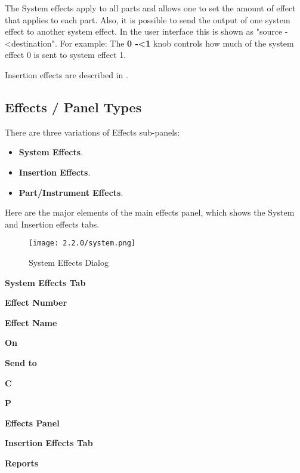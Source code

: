    The System effects apply to all parts and allows one to set the amount of
   effect that applies to each part. Also, it is possible to send the output
   of one system effect to another system effect. In the user interface this
   is shown as "source -\textless destination". For example:
   The \textbf{0 -\textless 1} knob controls how
   much of the system effect 0 is sent to system effect 1.

   Insertion effects are described in
   .

\subsection{Effects / Panel Types}
\label{subsec:effects_paneltypes}

   There are three variations of Effects sub-panels:

   \begin{itemize}
      \item \textbf{System Effects}.
      \item \textbf{Insertion Effects}.
      \item \textbf{Part/Instrument Effects}.
   \end{itemize}

   Here are the major elements of the main effects panel, which shows the
   System and Insertion effects tabs.

\begin{figure}[H]
   \centering
   \texttt{[image: 2.2.0/system.png]}
   \caption{System Effects Dialog}
   \label{fig:system_effects_dialog}
\end{figure}

   \begin{enumber}
      \item \textbf{System Effects Tab}
      \item \textbf{Effect Number}
      \item \textbf{Effect Name}
      \item \textbf{On}
      \item \textbf{Send to}
      \item \textbf{C}
      \item \textbf{P}
      \item \textbf{Effects Panel}
      \item \textbf{Insertion Effects Tab}
      \item \textbf{Reports}
   \end{enumber}

